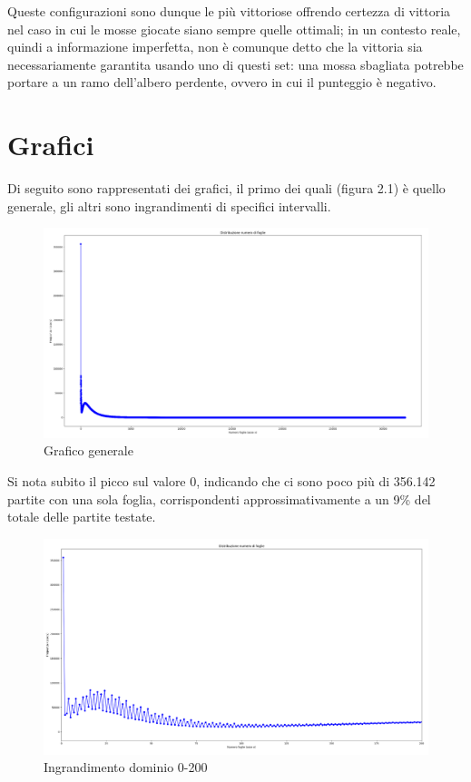 \documentclass[a4paper,12pt]{report} %
\begin{document}
Queste configurazioni sono dunque le più vittoriose offrendo certezza di vittoria nel caso in cui le mosse giocate siano sempre quelle ottimali; in un contesto reale, quindi a informazione imperfetta, non è comunque detto che la vittoria sia necessariamente garantita usando uno di questi set: una mossa sbagliata potrebbe portare a un ramo dell'albero perdente, ovvero in cui il punteggio è negativo.


\section{Grafici}

Di seguito sono rappresentati dei grafici, il primo dei quali (figura 2.1) è quello generale, gli altri sono ingrandimenti di specifici intervalli.


\begin{figure}[h!]
    \centering
    \includegraphics[width=1\textwidth]{imgs/grafico_base.png} %
    \caption{Grafico generale}
    \label{fig:etichetta}
\end{figure}

Si nota subito il picco sul valore 0, indicando che ci sono poco più di 356.142 partite con una sola foglia, corrispondenti approssimativamente a un 9\% del totale delle partite testate.


\begin{figure}[h!]
    \centering
    \includegraphics[width=1\textwidth]{imgs/grafico_0_200.png} %
    \caption{Ingrandimento dominio 0-200}
    \label{fig:etichetta}
\end{figure}
\end{document}
